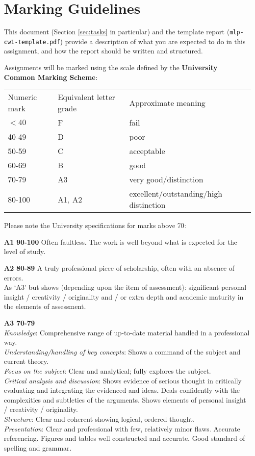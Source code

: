 \documentclass[11pt,]{article}
\begin{document}
\newpage
\section{Marking Guidelines}
\label{sec:marking-scheme}
This document (Section \ref{sec:tasks} in particular) and the template report (\verb+mlp-cw1-template.pdf+) provide a description of what you are expected to do in this assignment, and how the report should be written and structured.

Assignments will be marked using the scale defined by the \textbf{University Common Marking Scheme}:
\begin{center}
\begin{tabular}{lll}
Numeric mark & Equivalent letter grade & Approximate meaning \\
$< 40$ & F & fail \\
40-49 & D & poor \\
50-59 & C & acceptable \\
60-69 & B & good \\
70-79 & A3 & very good/distinction \\
80-100 & A1, A2 & excellent/outstanding/high distinction
\end{tabular}
\end{center}

Please note the University specifications for marks above 70:

{\bf A1 90-100}
Often faultless. The work is well beyond what is expected for the level of study.

{\bf A2 80-89}
A truly professional piece of scholarship, often with an absence of errors. \\
As `A3' but shows (depending upon the item of assessment):
significant personal insight / creativity / originality
and / or
extra depth and academic maturity in the elements of assessment.

{\bf A3 70-79}\\
\emph{Knowledge}: Comprehensive range of up-to-date material handled in a professional way.\\
\emph{Understanding/handling of key concepts}: Shows a command of the subject and current theory.\\
\emph{Focus on the subject}: Clear and analytical; fully explores the subject.\\
\emph{Critical analysis and discussion}: Shows evidence of serious thought in critically evaluating and integrating the evidenced and ideas. Deals confidently with the complexities and subtleties of the arguments. Shows elements of personal insight / creativity / originality.\\
\emph{Structure}: Clear and coherent showing logical, ordered thought.\\
\emph{Presentation}: Clear and professional with few, relatively minor flaws. Accurate referencing. Figures and tables well constructed and accurate. Good standard of spelling and grammar.
\end{document}
